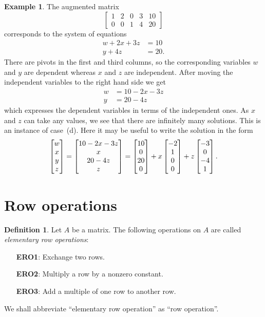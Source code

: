 \documentclass[reqno]{amsart}
\theoremstyle{definition}
\newtheorem{definition}[theorem]{Definition}
\newtheorem{example}[theorem]{Example}
\begin{document}
\begin{example}\label{eg-rref-solve-iii}
 The augmented matrix
 \[ \left[\begin{array}{cccc|c}
     1 & 2 & 0 & 3 & 10 \\
     0 & 0 & 1 & 4 & 20
    \end{array}\right]
 \]
 corresponds to the system of equations
 \begin{align*}
  w + 2x + 3z &= 10 \\
  y + 4z &= 20.
 \end{align*}
 There are pivots in the first and third columns, so the corresponding
 variables $w$ and $y$ are dependent whereas $x$ and $z$ are
 independent.  After moving the independent variables to the right
 hand side we get
 \begin{align*}
  w &= 10 - 2x - 3z \\
  y &= 20 - 4z
 \end{align*}
 which expresses the dependent variables in terms of the independent
 ones.  As $x$ and $z$ can take any values, we see that there are
 infinitely many solutions.  This is an instance of case~(d).  Here it
 may be useful to write the solution in the form 
 \[ \left[\begin{matrix} w \\ x \\ y \\ z \end{matrix}\right] =
    \left[\begin{matrix} 10-2x-3z \\ x \\ 20-4z \\ z \end{matrix}\right] =
    \left[\begin{matrix} 10 \\ 0 \\ 20 \\ 0 \end{matrix}\right] + 
    x \left[\begin{matrix} -2 \\ 1 \\ 0 \\ 0 \end{matrix}\right] + 
    z \left[\begin{matrix} -3 \\ 0 \\ -4 \\ 1 \end{matrix}\right].
 \]
\end{example}

\section{Row operations}
\label{sec-row-ops}

\begin{definition}\label{defn-ERO}
 Let $A$ be a matrix.  The following operations on $A$ are called
 \emph{elementary row operations}:
 \begin{itemize}
  \item[\textbf{ERO1}:] Exchange two rows.
  \item[\textbf{ERO2}:] Multiply a row by a nonzero constant.
  \item[\textbf{ERO3}:] Add a multiple of one row to another row.
 \end{itemize}
 
 We shall abbreviate ``elementary row operation'' as
 ``row operation''.
\end{definition}
\end{document}
